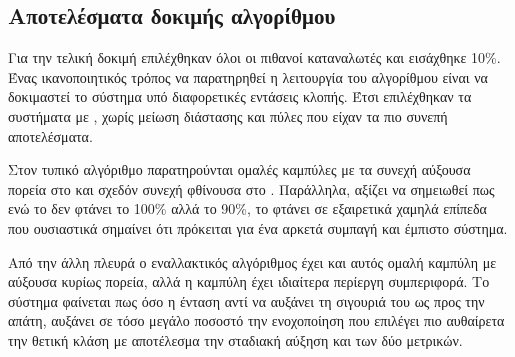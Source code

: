\subsection{Αποτελέσματα δοκιμής αλγορίθμου}
Για την τελική δοκιμή επιλέχθηκαν όλοι οι πιθανοί καταναλωτές και εισάχθηκε 10\%. Ένας ικανοποιητικός τρόπος να παρατηρηθεί η λειτουργία του αλγορίθμου είναι να δοκιμαστεί το σύστημα υπό διαφορετικές εντάσεις κλοπής. Έτσι επιλέχθηκαν τα συστήματα με , χωρίς μείωση διάστασης και πύλες  που είχαν τα πιο συνεπή αποτελέσματα.\par
Στον τυπικό αλγόριθμο παρατηρούνται ομαλές καμπύλες με τα συνεχή αύξουσα πορεία στο  και σχεδόν συνεχή φθίνουσα στο . Παράλληλα, αξίζει να σημειωθεί πως ενώ το  δεν φτάνει το 100\% αλλά το 90\%, το  φτάνει σε εξαιρετικά χαμηλά επίπεδα που ουσιαστικά σημαίνει ότι πρόκειται για ένα αρκετά συμπαγή και έμπιστο σύστημα.\par
Από την άλλη πλευρά ο εναλλακτικός αλγόριθμος έχει και αυτός ομαλή καμπύλη  με αύξουσα κυρίως πορεία, αλλά η καμπύλη  έχει ιδιαίτερα περίεργη συμπεριφορά. Το σύστημα φαίνεται πως όσο η ένταση αντί να αυξάνει τη σιγουριά του ως προς την απάτη, αυξάνει σε τόσο μεγάλο ποσοστό την ενοχοποίηση που επιλέγει πιο αυθαίρετα την θετική κλάση με αποτέλεσμα την σταδιακή αύξηση και των δύο μετρικών.

